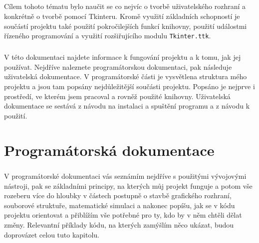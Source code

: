 \documentclass[12pt,a4paper]{report}
\begin{document}
\paragraph{} Cílem tohoto tématu bylo naučit se co nejvíc o tvorbě uživatelského rozhraní a konkrétně o tvorbě pomocí Tkinteru. Kromě využití základních schopností je součástí projektu také použití pokročilejších funkcí knihovny, použití událostmi řízeného programování a využití rozšiřujícího modulu \lstinline{Tkinter.ttk}.
\paragraph{} V této dokumentaci najdete informace k fungování projektu a k tomu, jak jej používat. Nejdříve naleznete programátorskou dokumentaci, pak následuje uživatelská dokumentace. V programátorské části je vysvětlena struktura mého projektu a jsou tam popsány nejdůležitější součásti projektu. Popsáno je nejprve i prostředí, ve kterém jsem pracoval a rovněž použité knihovny. Uživatelská dokumentace se sestává z návodu na instalaci a spuštění programu a z návodu k použití.

\chapter{Programátorská dokumentace}
\paragraph{} V programátorské dokumentaci vás seznámím nejdříve s použitými vývojovými nástroji, pak se základními principy, na kterých můj projekt funguje a potom vše rozeberu více do hloubky v částech postupně o stavbě grafického rozhraní, souborové struktuře, matematické simulaci a nakonec popíšu, jak se v kódu projektu orientovat a přiblížím vše potřebné pro ty, kdo by v něm chtěli dělat změny. Relevantní příklady kódu, na kterých zamýšlím něco ukázat, budou doprovázet celou tuto kapitolu.
\end{document}
